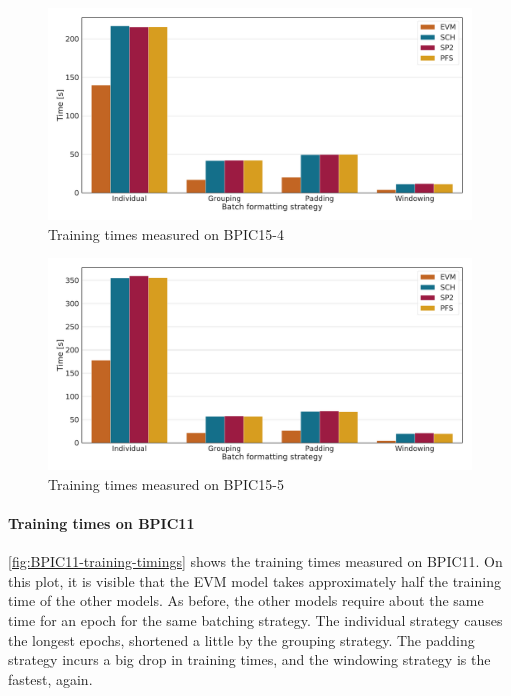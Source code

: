 \begin{figure}[!htb]
    \centering
    \includegraphics[width=\textwidth]{gfx/bpic2015_4/train_timings.pdf}
    \caption{Training times measured on BPIC15-4}
    \label{fig:BPIC15-4-training-timings}
\end{figure}
\begin{figure}[!htb]
    \centering
    \includegraphics[width=\textwidth]{gfx/bpic2015_5/train_timings.pdf}
    \caption{Training times measured on BPIC15-5}
    \label{fig:BPIC15-5-training-timings}
\end{figure}
\FloatBarrier
\newpage
\paragraph{Training times on BPIC11}
\autoref{fig:BPIC11-training-timings} shows the training times measured on BPIC11.
On this plot, it is visible that the EVM model takes approximately half the training time of the other models.
As before, the other models require about the same time for an epoch for the same batching strategy.
The individual strategy causes the longest epochs, shortened a little by the grouping strategy.
The padding strategy incurs a big drop in training times, and the windowing strategy is the fastest, again.


